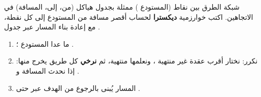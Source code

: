 \begin{statement}
شبكة الطرق بين  نقاط (المستودع ) ممثلة بجدول هياكل  (من، إلى، المسافة) في الاتجاهين. اكتب خوارزمية \textbf{ديكسترا} لحساب أقصر مسافة من المستودع إلى كل نقطة، مع إعادة بناء المسار عبر جدول .
\end{statement}
\begin{stepsbox}\begin{enumerate}
\item {} ما عدا المستودع ؛ .
\item نكرر: نختار أقرب عقدة غير منتهية ، ونعلمها منتهية، ثم \textbf{نرخي} كل طريق يخرج منها: إذا  نحدث المسافة و .
\item المسار يُبنى بالرجوع من الهدف عبر  حتى .
\end{enumerate}\end{stepsbox}
